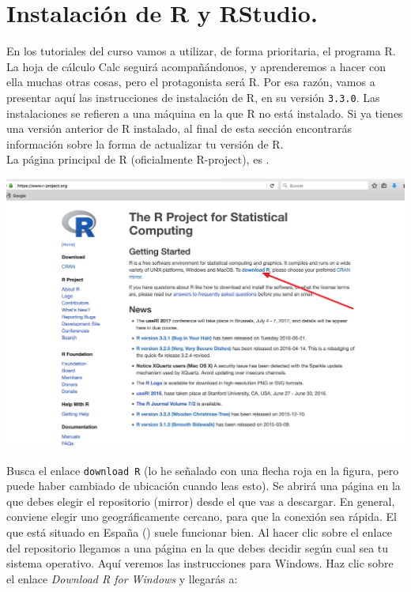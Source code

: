 \documentclass[10pt,a4paper]{article}\usepackage[]{graphicx}\usepackage[]{color}
\newcounter {cont01}
\begin{document}
\section{Instalación de R y RStudio.}

En los tutoriales del curso vamos a utilizar, de forma prioritaria, el programa R. La hoja de
cálculo Calc seguirá acompañándonos, y aprenderemos a hacer con ella muchas otras cosas, pero el
protagonista será R. Por esa razón, vamos a presentar aquí las instrucciones de instalación de R,
en su versión {\tt 3.3.0}. Las instalaciones se refieren a una máquina en la que R {\sf no está
instalado}.
Si ya tienes una versión anterior de R instalado, al final de esta sección encontrarás información sobre la forma de actualizar tu versión de R. \quad\\
La página principal de R (oficialmente R-project), es
.
    \begin{center}
    \includegraphics[width=15cm]{../fig/Tut00-35a.png}
    \end{center}
Busca el enlace {\tt download R} (lo he señalado con una flecha roja en la figura, pero puede haber
cambiado de ubicación cuando leas esto). Se abrirá una página en la que debes elegir el repositorio
(mirror) desde el que vas a descargar. En general, conviene elegir uno geográficamente cercano,
para que la conexión sea rápida. El que está situado en España
() suele funcionar bien. Al hacer clic sobre el enlace del repositorio llegamos a una página en la que debes decidir según cual sea tu sistema operativo. Aquí veremos las instrucciones para Windows. Haz clic sobre el enlace {\em Download R for Windows} y llegarás a:
\end{document}

